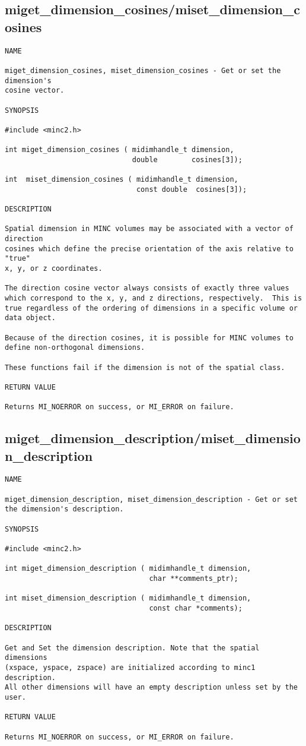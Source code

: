 \documentclass{article}
\begin{document}
\subsection{miget\_dimension\_cosines/miset\_dimension\_cosines}
\begin{verbatim}
NAME

miget_dimension_cosines, miset_dimension_cosines - Get or set the dimension's
cosine vector.

SYNOPSIS

#include <minc2.h>

int miget_dimension_cosines ( midimhandle_t dimension,
                              double        cosines[3]);

int  miset_dimension_cosines ( midimhandle_t dimension,
                               const double  cosines[3]);

DESCRIPTION

Spatial dimension in MINC volumes may be associated with a vector of direction
cosines which define the precise orientation of the axis relative to "true"
x, y, or z coordinates.

The direction cosine vector always consists of exactly three values
which correspond to the x, y, and z directions, respectively.  This is
true regardless of the ordering of dimensions in a specific volume or
data object.

Because of the direction cosines, it is possible for MINC volumes to
define non-orthogonal dimensions.

These functions fail if the dimension is not of the spatial class.

RETURN VALUE

Returns MI_NOERROR on success, or MI_ERROR on failure.
\end{verbatim}

\subsection{miget\_dimension\_description/miset\_dimension\_description}
\begin{verbatim}
NAME

miget_dimension_description, miset_dimension_description - Get or set the dimension's description.

SYNOPSIS

#include <minc2.h>

int miget_dimension_description ( midimhandle_t dimension,
                                  char **comments_ptr);

int miset_dimension_description ( midimhandle_t dimension,
                                  const char *comments);

DESCRIPTION

Get and Set the dimension description. Note that the spatial dimensions
(xspace, yspace, zspace) are initialized according to minc1 description.
All other dimensions will have an empty description unless set by the user.

RETURN VALUE

Returns MI_NOERROR on success, or MI_ERROR on failure.
\end{verbatim}
\end{document}
